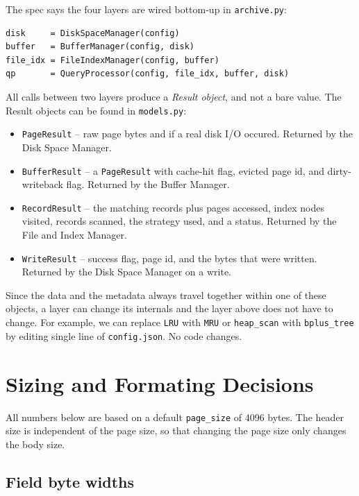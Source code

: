 \documentclass[12pt]{article}
\begin{document}
The spec says the four layers are wired bottom-up in \texttt{archive.py}:

\begin{verbatim}
disk     = DiskSpaceManager(config)
buffer   = BufferManager(config, disk)
file_idx = FileIndexManager(config, buffer)
qp       = QueryProcessor(config, file_idx, buffer, disk)
\end{verbatim}

All calls between two layers produce a \emph{Result object}, and not a bare
value. The Result objects can be found in \texttt{models.py}:

\begin{itemize}[noitemsep]
  \item \texttt{PageResult} -- raw page bytes and if a real disk I/O
        occured. Returned by the Disk Space Manager.
  \item \texttt{BufferResult} -- a \texttt{PageResult} with cache-hit flag,
        evicted page id, and dirty-writeback flag. Returned by the Buffer
        Manager.
  \item \texttt{RecordResult} -- the matching records plus pages accessed,
        index nodes visited, records scanned, the strategy used, and a
        status. Returned by the File and Index Manager.
  \item \texttt{WriteResult} -- success flag, page id, and the bytes that
        were written. Returned by the Disk Space Manager on a write.
\end{itemize}

Since the data and the metadata always travel together within one of
these objects, a layer can change its internals and the layer above does
not have to change. For example, we can replace \texttt{LRU} with \texttt{MRU}
or \texttt{heap\_scan} with \texttt{bplus\_tree} by editing single line of
\texttt{config.json}. No code changes.

\section{Sizing and Formating Decisions}
\label{sec:sizing}

All numbers below are based on a default \texttt{page\_size} of 4096 bytes. The
header size is independent of the page size, so that changing the page size only
changes the body size.

\subsection{Field byte widths}
\end{document}
